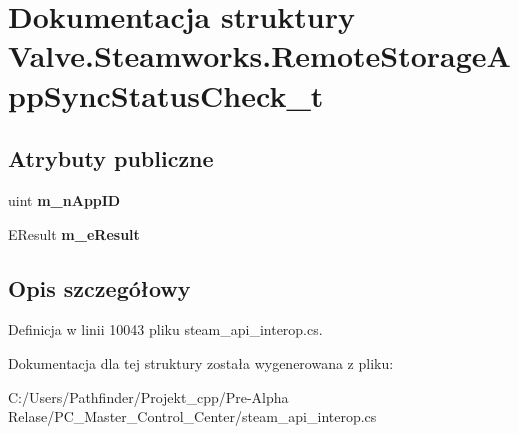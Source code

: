 \hypertarget{struct_valve_1_1_steamworks_1_1_remote_storage_app_sync_status_check__t}{}\section{Dokumentacja struktury Valve.\+Steamworks.\+Remote\+Storage\+App\+Sync\+Status\+Check\+\_\+t}
\label{struct_valve_1_1_steamworks_1_1_remote_storage_app_sync_status_check__t}
\subsection*{Atrybuty publiczne}
\begin{DoxyCompactItemize}
\item 
\mbox{\label{struct_valve_1_1_steamworks_1_1_remote_storage_app_sync_status_check__t_adc08697f3ba7bb5de65352da564a7c77}} 
uint {\bfseries m\+\_\+n\+App\+ID}
\item 
\mbox{\label{struct_valve_1_1_steamworks_1_1_remote_storage_app_sync_status_check__t_ae81ba6c3de5c4ddb383df64f87ad2558}} 
E\+Result {\bfseries m\+\_\+e\+Result}
\end{DoxyCompactItemize}


\subsection{Opis szczegółowy}


Definicja w linii 10043 pliku steam\+\_\+api\+\_\+interop.\+cs.



Dokumentacja dla tej struktury została wygenerowana z pliku\+:\begin{DoxyCompactItemize}
\item 
C\+:/\+Users/\+Pathfinder/\+Projekt\+\_\+cpp/\+Pre-\/\+Alpha Relase/\+P\+C\+\_\+\+Master\+\_\+\+Control\+\_\+\+Center/steam\+\_\+api\+\_\+interop.\+cs\end{DoxyCompactItemize}
